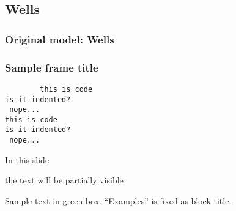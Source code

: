 \documentclass{beamer}
\begin{document}
\subsection{Wells}
\begin{frame}
    \frametitle{Original model: Wells}
\end{frame}

\begin{frame}[fragile]
	\frametitle{Sample frame title}
	\begin{code}
        \begin{verbatim}
        this is code
is it indented?
 nope...
this is code
is it indented?
 nope...
        \end{verbatim}
    \end{code}
\end{frame}

\begin{frame}
 In this slide \pause
 
 the text will be partially visible
\end{frame}


\begin{frame}
	\begin{remark}
		Sample text in green box. ``Examples'' is fixed as block title.
	\end{remark}
\end{frame}
 
\end{document}
